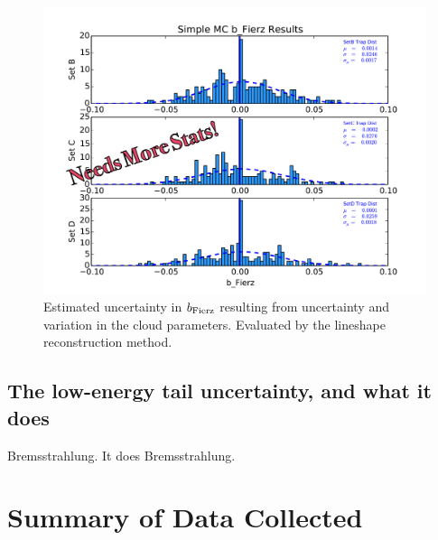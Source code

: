 	    \begin{figure}[h!!]
    	\centering
    	\includegraphics[width=.999\linewidth]
    	{Figures/Position_Err_bFierz_prelim.pdf}
    	\caption[$\bFierz$ Position Error]{Estimated uncertainty in $\bFierz$ resulting from uncertainty and variation in the cloud parameters.  Evaluated by the lineshape reconstruction method.}		
    	\label{fig:bFierz_position_err}
		\end{figure}

	
	\subsection{The low-energy tail uncertainty, and what it does}
	Bremsstrahlung.  It does Bremsstrahlung.


\section{Summary of Data Collected}

